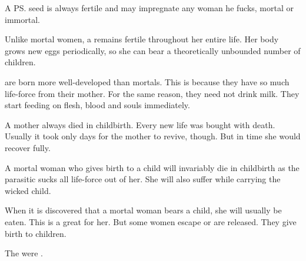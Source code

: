 A \ps{\resphan} seed is always fertile and may impregnate any woman he fucks, mortal or immortal. 

Unlike mortal women, a \resvil{} remains fertile throughout her entire life. 
Her body grows new eggs periodically, so she can bear a theoretically unbounded number of children. 

\Resphain{} are born more well-developed than mortals. 
This is because they have  so much life-force from their mother. 
For the same reason, they need not drink milk. 
They start feeding on flesh, blood and souls immediately. 

A \resvil mother always died in childbirth.
Every new \resphan life was bought with death.
Usually it took only days for the mother to revive, though.
But in time she would recover fully. 

A mortal woman who gives birth to a \resphan{} child will invariably die in childbirth as the parasitic \resphan{} sucks all life-force out of her. 
She will also suffer while carrying the wicked child. 

When it is discovered that a mortal woman bears a \resphan{} child, she will usually be eaten. 
This is a great \honour for her. 
But some women escape or are released. 
They give birth to  children. 

The \Mystraacht were .






